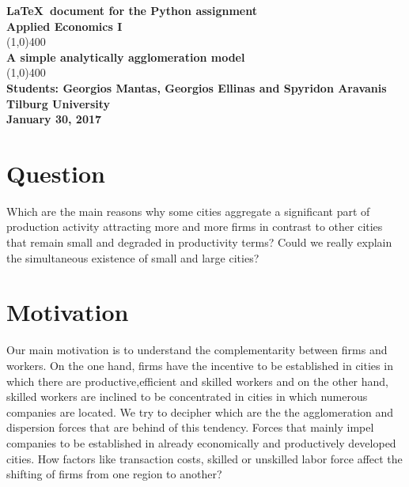 \documentclass[11pt]{article}
\begin{document}
\begin{titlepage}
\begin{center}
\vspace*{1cm}
\huge{\textbf{ \LaTeX \ document for the Python assignment}}\\
\Large{\textbf{Applied Economics I}}\\
\vfill
\line(1,0){400}\\[3mm]
\huge{\textbf{A simple analytically agglomeration model}}\\[1mm]
\line(1,0){400}\\
\vfill
 \Large{\textbf {Students: Georgios Mantas, Georgios Ellinas and Spyridon Aravanis}}\\
 \Large{\textbf {Tilburg University}}\\
\Large{\textbf{January 30, 2017}}
\end{center}
\end{titlepage}
\tableofcontents
\thispagestyle{empty}
\clearpage
\setcounter{page}{1}


\section{Question}
Which are the main reasons why some cities aggregate a significant part of production activity attracting more and more firms in contrast to other cities that remain small and degraded in productivity terms? Could we really explain the simultaneous existence of small and large cities?
\section{Motivation}
Our main motivation is to understand the complementarity between firms and workers. On the one hand, firms have the incentive to be established in cities in which there are productive,efficient and skilled workers and on the other hand, skilled workers are inclined to be concentrated in cities in which numerous companies are located. We try to decipher which are the the agglomeration and dispersion forces that are behind of this tendency. Forces that mainly impel companies to be established in already economically and productively developed cities. How factors like transaction costs, skilled or unskilled labor force affect the shifting of firms from one region to another?
\end{document}
